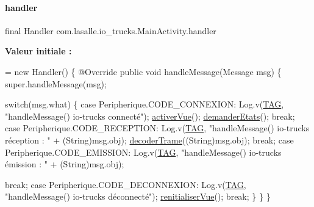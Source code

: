 \paragraph{\texorpdfstring{handler}{handler}}
{\footnotesize\ttfamily final Handler com.\+lasalle.\+io\+\_\+trucks.\+Main\+Activity.\+handler\hspace{0.3cm}{\ttfamily [private]}}

{\bfseries Valeur initiale \+:}
\begin{DoxyCode}
= \textcolor{keyword}{new} Handler()
    \{
        @Override
        \textcolor{keyword}{public} \textcolor{keywordtype}{void} handleMessage(Message msg)
        \{
            super.handleMessage(msg);

            \textcolor{keywordflow}{switch}(msg.what)
            \{
                \textcolor{keywordflow}{case} Peripherique.CODE\_CONNEXION:
                    Log.v(\hyperlink{classcom_1_1lasalle_1_1io__trucks_1_1_main_activity_a37b90dba972711328e3f4c83c55eb0fc}{TAG}, \textcolor{stringliteral}{"handleMessage() io-trucks connecté"});
                    \hyperlink{classcom_1_1lasalle_1_1io__trucks_1_1_main_activity_a09f9deded45d212d479d2206ddf52749}{activerVue}();
                    \hyperlink{classcom_1_1lasalle_1_1io__trucks_1_1_main_activity_aa9cd705ec555f1a41d39172ad2e9fb61}{demanderEtats}();
                    \textcolor{keywordflow}{break};
                \textcolor{keywordflow}{case} Peripherique.CODE\_RECEPTION:
                    Log.v(\hyperlink{classcom_1_1lasalle_1_1io__trucks_1_1_main_activity_a37b90dba972711328e3f4c83c55eb0fc}{TAG}, \textcolor{stringliteral}{"handleMessage() io-trucks réception : "} + (String)msg.obj);
                    \hyperlink{classcom_1_1lasalle_1_1io__trucks_1_1_main_activity_afee6fb53a4414e7b577ea329fd473ba4}{decoderTrame}((String)msg.obj);
                    \textcolor{keywordflow}{break};
                \textcolor{keywordflow}{case} Peripherique.CODE\_EMISSION:
                    Log.v(\hyperlink{classcom_1_1lasalle_1_1io__trucks_1_1_main_activity_a37b90dba972711328e3f4c83c55eb0fc}{TAG}, \textcolor{stringliteral}{"handleMessage() io-trucks émission : "} + (String)msg.obj);
                    
                    \textcolor{keywordflow}{break};
                \textcolor{keywordflow}{case} Peripherique.CODE\_DECONNEXION:
                    Log.v(\hyperlink{classcom_1_1lasalle_1_1io__trucks_1_1_main_activity_a37b90dba972711328e3f4c83c55eb0fc}{TAG}, \textcolor{stringliteral}{"handleMessage() io-trucks déconnecté"});
                    \hyperlink{classcom_1_1lasalle_1_1io__trucks_1_1_main_activity_ac4c0bdaf761a42e924c6cf9d1b9a0e23}{renitialiserVue}();
                    \textcolor{keywordflow}{break};
            \}
        \}
    \}
\end{DoxyCode}


